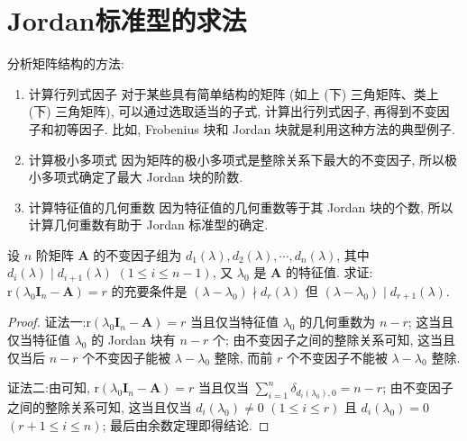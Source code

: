 \documentclass[../../main.tex]{subfiles}%
\begin{document}
\section{Jordan标准型的求法}\label{section:Jordan标准型的求法}

\hypertarget{分析矩阵结构的方法}{分析矩阵结构的方法:}
\begin{enumerate}[(1)]
\item 计算行列式因子 对于某些具有简单结构的矩阵 (如上 (下) 三角矩阵、类上 (下) 三角矩阵), 可以通过选取适当的子式, 计算出行列式因子, 再得到不变因子和初等因子. 比如, Frobenius 块和 Jordan 块就是利用这种方法的典型例子.

\item 计算极小多项式 因为矩阵的极小多项式是整除关系下最大的不变因子, 所以极小多项式确定了最大 Jordan 块的阶数.

\item 计算特征值的几何重数 因为特征值的几何重数等于其 Jordan 块的个数, 所以计算几何重数有助于 Jordan 标准型的确定. 
\end{enumerate}

\begin{proposition}\label{proposition:矩阵任一特征值对应的特征矩阵的秩为r的充要条件}
设 \(n\) 阶矩阵 \(\boldsymbol{A}\) 的不变因子组为 \(d_1(\lambda), d_2(\lambda), \cdots, d_n(\lambda)\), 其中 \(d_i(\lambda) \mid d_{i + 1}(\lambda)\) \((1 \leqslant  i \leqslant  n - 1)\), 又 \(\lambda_0\) 是 \(\boldsymbol{A}\) 的特征值. 求证: \(\mathrm{r}(\lambda_0\boldsymbol{I}_n - \boldsymbol{A}) = r\) 的充要条件是 \((\lambda - \lambda_0) \nmid d_r(\lambda)\) 但 \((\lambda - \lambda_0) \mid d_{r + 1}(\lambda)\).
\end{proposition}
\begin{proof}

{\color{blue}证法一:}\(\mathrm{r}(\lambda_0\boldsymbol{I}_n - \boldsymbol{A}) = r\) 当且仅当特征值 \(\lambda_0\) 的几何重数为 \(n - r\); 这当且仅当特征值 \(\lambda_0\) 的 Jordan 块有 \(n - r\) 个; 由不变因子之间的整除关系可知, 这当且仅当后 \(n - r\) 个不变因子能被 \(\lambda - \lambda_0\) 整除, 而前 \(r\) 个不变因子不能被 \(\lambda - \lambda_0\) 整除.

{\color{blue}证法二:}由可知, \(\mathrm{r}(\lambda_0\boldsymbol{I}_n - \boldsymbol{A}) = r\) 当且仅当 \(\sum_{i = 1}^{n} \delta_{d_i(\lambda_0),0} = n - r\); 由不变因子之间的整除关系可知, 这当且仅当 \(d_i(\lambda_0) \neq 0\) \((1 \leqslant  i \leqslant  r)\) 且 \(d_i(\lambda_0) = 0\) \((r + 1 \leqslant  i \leqslant  n)\); 最后由余数定理即得结论.
\end{proof}
\end{document}
